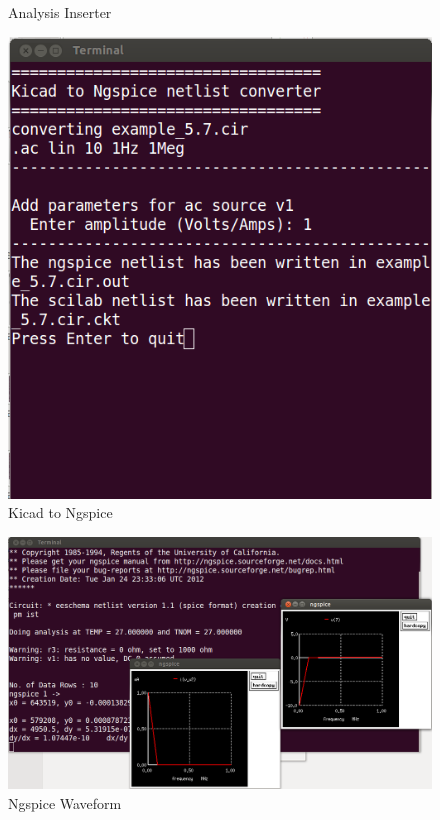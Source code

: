 \begin{enumerate}
\begin{figure}
\begin{center}
\caption{Analysis Inserter}
\label{34}
\end{center}
\end{figure}
\begin{figure}%
\begin{center}
\includegraphics[width=1\linewidth]{figures/apd35.png}%
\caption{Kicad to Ngspice}
\label{35}
\end{center}
\end{figure}
\begin{figure}%
\begin{center}
\includegraphics[width=1\linewidth]{figures/apd36.png}%
\caption{Ngspice Waveform}
\label{36}
\end{center}
\end{figure}
\end{enumerate}
